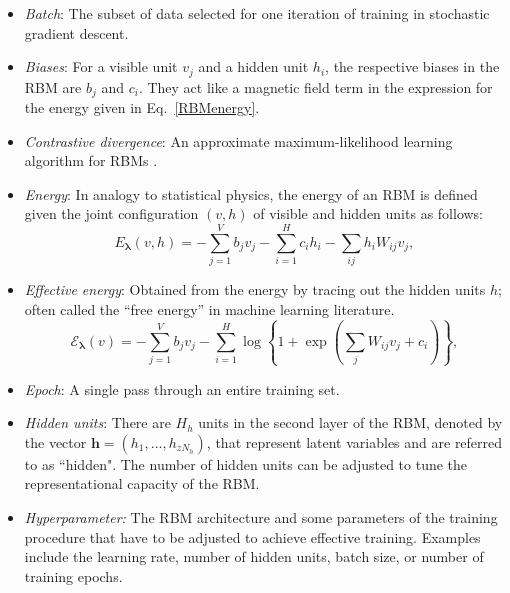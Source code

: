 \documentclass[submission, Phys, hidelnks]{SciPost}
\begin{document}
\begin{itemize}

\item {\it Batch}: The subset of data selected for one iteration of training in stochastic gradient descent.

\item {\it Biases}: For a visible unit $v_j$ and a hidden unit $h_i$, the respective biases in the RBM are $b_j$ and $c_i$. They act like a magnetic field term in the expression for the energy given in Eq.~\eqref{RBMenergy}.

\item {\it Contrastive divergence}: An approximate maximum-likelihood learning algorithm for RBMs \cite{hinton2002training}.

\item {\it Energy}: In analogy to statistical physics, the energy of an RBM is defined given the joint configuration $(v, h)$ of visible and hidden units as follows:
\begin{equation}
   E_{\bm{\lambda}}(v,h) = - \sum\limits_{j=1}^V b_j v_j - \sum\limits_{i=1}^H c_i h_i - \sum\limits_{ij} h_i W_{ij} v_j, \label{RBMenergy}
\end{equation}

\item {\it Effective energy}: Obtained from the energy by tracing out the hidden units $h$; often called the ``free energy'' in machine learning literature.
\begin{equation}
   \mathcal{E}_{\bm{\lambda}}(v) = - \sum\limits_{j=1}^V b_j v_j - \sum\limits_{i=1}^H \log \left\{ 1 + \exp \left( \sum\limits_{j} W_{ij}v_j +c_i\right) \right\}, \label{RBMeffectiveenergy}
\end{equation}

\item {\it Epoch}: A single pass through an entire training set.

\item {\it Hidden units}: There are $H_h$ units in the second layer of the RBM, denoted by the vector $\mathbf{h}=(h_1, ..., h_{zN_h})$, that represent latent variables and are referred to as ``hidden". The number of hidden units can be adjusted to tune the representational capacity of the RBM.

\item{\it Hyperparameter:} The RBM architecture and some parameters of the training procedure that have to be adjusted to achieve effective training. Examples include the learning rate, number of hidden units, batch size, or number of training epochs.


\end{itemize}
\end{document}
